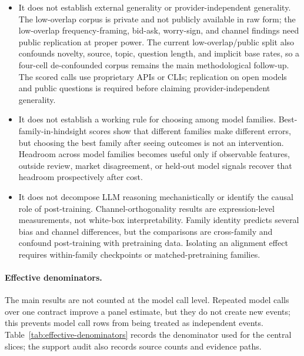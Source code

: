 \documentclass[11pt]{article}
\begin{document}
\begin{itemize}[leftmargin=*]
\item It does not establish external generality or provider-independent generality. The low-overlap corpus is private and not publicly available in raw form; the low-overlap frequency-framing, bid-ask, worry-sign, and channel findings need public replication at proper power. The current low-overlap/public split also confounds novelty, source, topic, question length, and implicit base rates, so a four-cell de-confounded corpus remains the main methodological follow-up. The scored calls use proprietary APIs or CLIs; replication on open models and public questions is required before claiming provider-independent generality.
\item It does not establish a working rule for choosing among model families. Best-family-in-hindsight scores show that different families make different errors, but choosing the best family after seeing outcomes is not an intervention. Headroom across model families becomes useful only if observable features, outside review, market disagreement, or held-out model signals recover that headroom prospectively after cost.
\item It does not decompose LLM reasoning mechanistically or identify the causal role of post-training. Channel-orthogonality results are expression-level measurements, not white-box interpretability. Family identity predicts several bias and channel differences, but the comparisons are cross-family and confound post-training with pretraining data. Isolating an alignment effect requires within-family checkpoints or matched-pretraining families.
\end{itemize}

\paragraph{Effective denominators.} The main results are not counted at the model call level. Repeated model calls over one contract improve a panel estimate, but they do not create new events; this prevents model call rows from being treated as independent events. Table~\ref{tab:effective-denominators} records the denominator used for the central slices; the support audit also records source counts and evidence paths.
\end{document}
